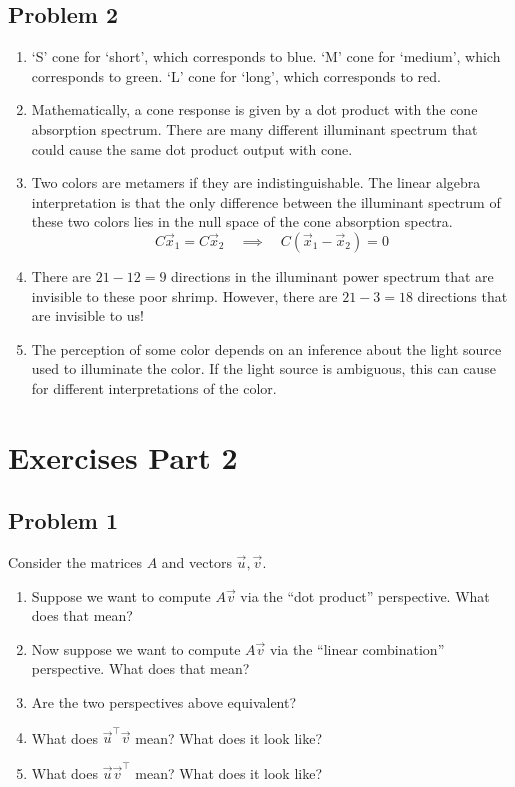 \documentclass[11pt]{article}
\begin{document}
\subsection*{Problem 2}
\begin{enumerate}
    \item[(a)] `S' cone for `short', which corresponds to blue. `M' cone for `medium', which corresponds to green. `L' cone for `long', which corresponds to red.
    \item[(b)] Mathematically, a cone response is given by a dot product with the cone absorption spectrum. There are many different illuminant spectrum that could cause the same dot product output with cone.
    \item[(c)] Two colors are metamers if they are indistinguishable. The linear algebra interpretation is that the only difference between the illuminant spectrum of these two colors lies in the null space of the cone absorption spectra. \[ C\vec{x}_1 = C\vec{x}_2\quad \implies \quad C(\vec{x}_1-\vec{x}_2)=0 \]
    \item[(d)] There are $21-12=9$ directions in the illuminant power spectrum that are invisible to these poor shrimp. However, there are $21-3=18$ directions that are invisible to us!
    \item[(e)] The perception of some color depends on an inference about the light source used to illuminate the color. If the light source is ambiguous, this can cause for different interpretations of the color.
\end{enumerate}

\clearpage

\section*{Exercises Part 2}
\subsection*{Problem 1}
Consider the matrices $A$ and vectors $\vec{u},\vec{v}$.
\begin{enumerate}
    \item[(a)] Suppose we want to compute $A\vec{v}$ via the ``dot product'' perspective. What does that mean?
    \item[(b)] Now suppose we want to compute $A\vec{v}$ via the ``linear combination'' perspective. What does that mean?
    \item[(c)] Are the two perspectives above equivalent?
    \item[(d)] What does $\vec{u}^\top\vec{v}$ mean? What does it look like?
    \item[(e)] What does $\vec{u}\vec{v}^\top$ mean? What does it look like?
\end{enumerate}
\end{document}
